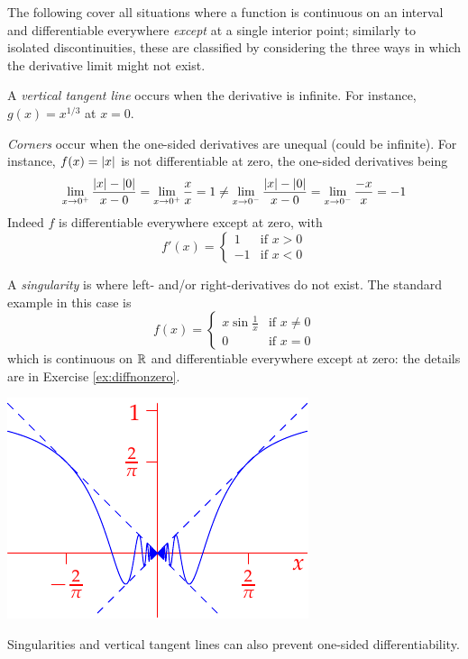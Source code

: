 \begin{examples}{}{}
The following cover all situations where a function is continuous on an interval and differentiable everywhere \emph{except} at a single interior point; similarly to isolated discontinuities, these are classified by considering the three ways in which the derivative limit might not exist. 
\begin{enumerate}
	\item A \emph{vertical tangent line} occurs when the derivative is infinite. For instance, $g(x)=x^{1/3}$ at $x=0$. 
  \item \emph{Corners} occur when the one-sided derivatives are unequal (could be infinite). For instance, $f(x)=\left| x\right|$ is not differentiable at zero, the one-sided derivatives being
  \begin{gather*}
  \lim_{x\to 0^+}\frac{\left| x\right|-\left| 0\right|}{x-0}=\lim_{x\to 0^+}\frac xx =1\neq
  \lim_{x\to 0^-}\frac{\left| x\right|-\left| 0\right|}{x-0}=\lim_{x\to 0^-}\frac{-x}x =-1
  \end{gather*}
	Indeed $f$ is differentiable everywhere except at zero, with
  \[f'(x)=\begin{cases}
	1&\text{if }x>0\\
	-1&\text{if }x<0
	\end{cases}\]

	\begin{minipage}[t]{0.65\linewidth}\vspace{0pt}
  \item A \emph{singularity} is where left- and/or right-derivatives do not exist. The standard example in this case is
  \[f(x)=\begin{cases}
  x\sin\frac 1x&\text{if }x\neq 0\\
  0&\text{if }x=0
  \end{cases}\]
  which is continuous on $\mathbb{R}$ and differentiable everywhere except at zero: the details are in Exercise \ref{ex:diffnonzero}.
  \end{minipage}\begin{minipage}[t]{0.35\linewidth}\vspace{0pt}
  \flushright\includegraphics[scale=0.9]{unifcontex2}
  \end{minipage}
\end{enumerate}
 Singularities and vertical tangent lines can also prevent one-sided differentiability.
\end{examples}

